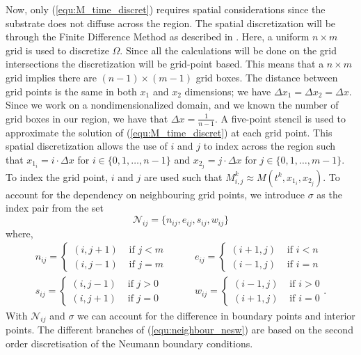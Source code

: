 Now, only (\ref{equ:M_time_discret}) requires spatial considerations since the substrate does not diffuse across the region.
The spatial discretization will be through the Finite Difference Method as described in \cite{saad2003iterativeMethod}.
Here, a uniform $n \times m$ grid is used to discretize $\Omega$.
Since all the calculations will be done on the grid intersections the discretization will be grid-point based.
This means that a $n \times m$ grid implies there are $(n-1) \times (m-1)$ grid boxes.
The distance between grid points is the same in both $x_1$ and $x_2$ dimensions; we have $\Delta x_1 = \Delta x_2 = \Delta x$.
Since we work on a nondimensionalized domain, and we known the number of grid boxes in our region, we have that $\Delta x = \frac{1}{n-1}$.
A five-point stencil is used to approximate the solution of (\ref{equ:M_time_discret}) at each grid point.
This spatial discretization allows the use of $i$ and $j$ to index across the region such that $x_{1_i} = i \cdot \Delta x$ for $i \in \{ 0, 1, \ldots, n-1 \}$ and $x_{2_j} = j \cdot \Delta x$ for $j \in \{ 0, 1, \ldots, m-1 \}$.
To index the grid point, $i$ and $j$ are used such that $M^{k}_{i,j} \approx M(t^{k}, x_{1_i}, x_{2_j})$.
To account for the dependency on neighbouring grid points, we introduce $\sigma$ as the index pair from the set 
\begin{equation}\label{equ:neighbour}
  \mathcal{N}_{ij} = \{n_{ij}, e_{ij}, s_{ij}, w_{ij}\}
\end{equation}
where, 
\begin{equation} \label{equ:neighbour_nesw}
  \begin{aligned}
    n_{ij} = \begin{cases} 
      (i,j+1)  & \text{ if } j < m \\
      (i,j-1)  & \text{ if } j = m \end{cases}
    & \qquad 
    e_{ij} = \begin{cases}
      (i+1,j)  & \text{ if } i < n \\
      (i-1,j)  & \text{ if } i = n \end{cases}
    \\
    s_{ij} = \begin{cases}
      (i,j-1)  & \text{ if } j > 0 \\
      (i,j+1)  & \text{ if } j = 0 \end{cases}
    & \qquad 
    w_{ij} = \begin{cases}
      (i-1,j)  & \text{ if } i > 0\\
      (i+1,j)  & \text{ if } i = 0 \end{cases}.
  \end{aligned}
\end{equation}
With $\mathcal{N}_{ij}$ and $\sigma$ we can account for the difference in boundary points and interior points.
The different branches of (\ref{equ:neighbour_nesw}) are based on the second order discretisation of the Neumann boundary conditions. 

